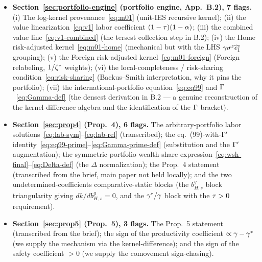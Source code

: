 \begin{itemize}[leftmargin=1.6em,itemsep=2pt]
  \item \textbf{Section~\ref{sec:portfolio-engine} (portfolio engine, App.~B.2),
  7 flags.} (i) The log-kernel provenance~\eqref{eq:m01} (unit-IES recursive
  kernel); (ii) the value linearization~\eqref{eq:v1} labor coefficient
  $(1-\tau)(1-\alpha)$; (iii) the combined value
  line~\eqref{eq:v1-combined} (the tersest collection step in B.2); (iv) the Home
  risk-adjusted kernel~\eqref{eq:m01-home} (mechanical but with the LHS
  $\gamma\sigma^z\widehat{\epsilon}^z_1$ grouping); (v) the Foreign risk-adjusted
  kernel~\eqref{eq:m01-foreign} (Foreign relabeling, $1/\zeta^{*}$ weights); (vi) the
  local-completeness / risk-sharing condition~\eqref{eq:risk-sharing}
  (Backus--Smith interpretation, why it pins the portfolio); (vii) the
  international-portfolio equation~\eqref{eq:eq99} and $\Gamma$~\eqref{eq:Gamma-def}
  (the densest derivation in B.2 --- a genuine reconstruction of the
  kernel-difference algebra and the identification of the $\Gamma$ bracket).

  \item \textbf{Section~\ref{sec:prop4} (Prop.~4), 6 flags.} The
  arbitrary-portfolio labor solutions~\eqref{eq:lab-sym}--\eqref{eq:lab-rel}
  (transcribed); the eq.~(99)-with-$\Gamma'$
  identity~\eqref{eq:eq99-prime}--\eqref{eq:Gamma-prime-def} (substitution and the
  $\Gamma'$ augmentation); the symmetric-portfolio wealth-share
  expression~\eqref{eq:wsh-final}--\eqref{eq:Delta-def} (the $\Delta$
  normalization); the Prop.~4 statement (transcribed from the brief, main paper
  not held locally); and the two undetermined-coefficients comparative-static
  blocks (the $b^g_{H,s}$ block triangularity giving $dk/db^g_{H,s}=0$, and the
  $\gamma^{*}/\gamma$ block with the $\tau>0$ requirement).

  \item \textbf{Section~\ref{sec:prop5} (Prop.~5), 3 flags.} The Prop.~5 statement
  (transcribed from the brief); the sign of the productivity coefficient
  $\propto\gamma-\gamma^{*}$ (we supply the mechanism via the kernel-difference); and the
  sign of the safety coefficient $>0$ (we supply the comovement sign-chasing).


\end{itemize}
